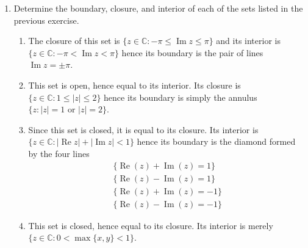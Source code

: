 \documentclass[12pt,leqno]{book}
\theoremstyle{definition}
\newcommand{\re}{\operatorname{Re}}
\newcommand{\im}{\operatorname{Im}}
\newcommand{\R}{\mathbb{R}}
\newcommand{\C}{\mathbb{C}}
\newenvironment{Proof}{\begin{proof}[\textnormal{\textbf{Proof}}]}{\end{proof}}
\begin{document}
\begin{enumerate}
\begin{Proof}
 \begin{enumerate}
  \item This set is neither open nor closed. To see that it is non-open, observe that any open ball centered at $i\pi$ is not strictly contained in $A$. To see that it is not closed, we apply the same argument to show that its closure is not open: any open ball centered at $-i\pi$ is not strictly contained in $A^c$. 
  \item This set is clearly open: for any point $z\in B$, take $\epsilon=\min(\frac{2-|z|}{2},\frac{|z|-1}{2})$. Then the ball of radius epsilon centered at $z$ is contained in $B$.
  \item This is the same set as $\{(x,y)|x+y\leq1\}\subseteq\R^2$ which is clearly closed.
  \item This set is neither open nor closed, as it is merely the union of unit squares with vertex at the origin in regions I, II and IV, with the origin removed.
  \item This set is clearly open.
  \item This set is neither open nor closed, for its closure is in fact all of $\C$ and its interior is empty. 
 \end{enumerate}
\end{Proof}
 \item Determine the boundary, closure, and interior of each of the sets listed in the previous exercise.
  \begin{enumerate}
   \item The closure of this set is $\{z\in\C:-\pi\leq\im z\leq\pi\}$ and its interior is $\{z\in\C:-\pi<\im z<\pi\}$ hence its boundary is the pair of lines $\im z=\pm\pi$. 
   \item This set is open, hence equal to its interior. Its closure is $\{z\in\C:1\leq|z|\leq2\}$ hence its boundary is simply the annulus $\{z:|z|=1\text{ or }|z|=2\}$.
   \item Since this set is closed, it is equal to its closure. Its interior is $\{z\in\C:|\re z|+|\im z|<1\}$ hence its boundary is the diamond formed by the four lines \begin{align*}\{\re(z)+\im(z)=1\}\\\{\re(z)-\im(z)=1\}\\\{\re(z)+\im(z)=-1\}\\\{\re(z)-\im(z)=-1\}\end{align*}
   \item This set is closed, hence equal to its closure. Its interior is merely $\{z\in\C:0<\max\{x,y\}<1\}$.

\end{enumerate}
\end{enumerate}
\end{document}
